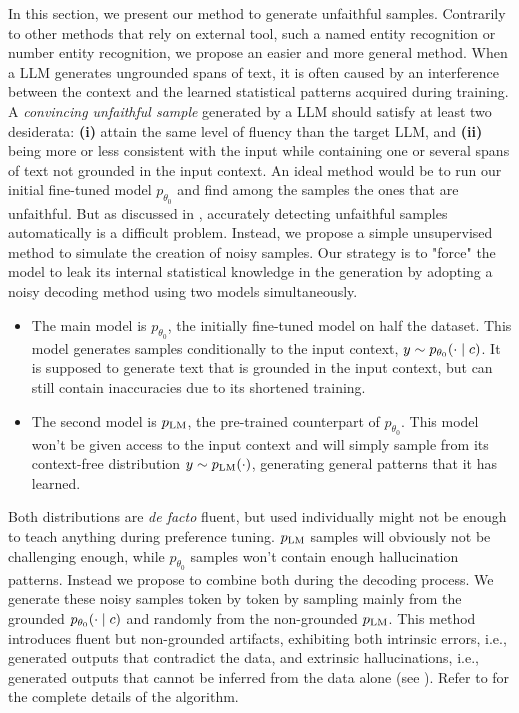In this section, we present our method to generate unfaithful samples. Contrarily to other methods that rely on external tool, such a named entity recognition or number entity recognition, we propose an easier and more general method.
When a LLM generates ungrounded spans of text, it is often caused by an interference between the context and the learned statistical patterns acquired during training. 
A \emph{convincing unfaithful sample} generated by a LLM should satisfy at least two desiderata: \textbf{(i)} attain the same level of fluency than the target LLM, and \textbf{(ii)} being more or less consistent with the input while containing one or several spans of text not grounded in the input context.
An ideal method would be to run our initial fine-tuned model $p_{\theta_0}$ and find among the samples the ones that are unfaithful.  But as discussed in , accurately detecting unfaithful samples automatically is a difficult problem. Instead, we propose a simple unsupervised method to simulate the creation of noisy samples. Our strategy is to "force" the model to leak its internal statistical knowledge in the generation by adopting a noisy decoding method using two models simultaneously.
\begin{itemize}[leftmargin=*]
    \item The main model is $p_{\theta_0}$, the initially fine-tuned model on half the dataset. This model generates samples conditionally to the input context, $y \sim p_{\theta_0}(\cdot \mid c)$. It is supposed to generate text that is grounded in the input context, but can still contain inaccuracies due to its shortened training.
    \item The second model is $p_{\text{LM}}$, the pre-trained counterpart of $p_{\theta_0}$. This model won't be given access to the input context and will simply sample from its context-free distribution $y \sim p_{\text{LM}}(\cdot)$, generating general patterns that it has learned.
\end{itemize}

Both distributions are \emph{de facto} fluent, but used individually might not be enough to teach anything during preference tuning. $p_{\text{LM}}$ samples will obviously not be challenging enough, while $p_{\theta_0}$ samples won't contain enough hallucination patterns.
Instead we propose to combine both during the decoding process. 
 We generate these noisy samples token by token by sampling mainly from the grounded $p_{\theta_0}(\cdot \mid c)$ and randomly from the non-grounded $p_{\text{LM}}$. This method introduces fluent but non-grounded artifacts, exhibiting both intrinsic errors, i.e., generated outputs that contradict the data, and extrinsic hallucinations, i.e., generated outputs that cannot be inferred from the data alone (see ). Refer to  for the complete details of the algorithm.




